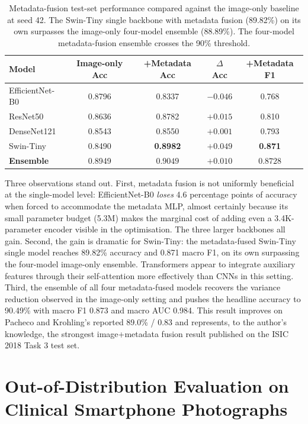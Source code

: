\begin{table}[H]
\centering
\caption{Metadata-fusion test-set performance compared against the image-only baseline at seed 42. The Swin-Tiny single backbone with metadata fusion (89.82\%) on its own surpasses the image-only four-model ensemble (88.89\%). The four-model metadata-fusion ensemble crosses the 90\% threshold.}
\label{tab:meta_fusion}
\begin{tabular}{lcccc}
\toprule
\textbf{Model} & \textbf{Image-only Acc} & \textbf{+Metadata Acc} & \textbf{$\Delta$ Acc} & \textbf{+Metadata F1} \\
\midrule
EfficientNet-B0 & 0.8796 & 0.8337 & $-0.046$ & 0.768 \\
ResNet50        & 0.8636 & 0.8782 & $+0.015$ & 0.810 \\
DenseNet121     & 0.8543 & 0.8550 & $+0.001$ & 0.793 \\
Swin-Tiny       & 0.8490 & \textbf{0.8982} & $\mathbf{+0.049}$ & \textbf{0.871} \\
\midrule
\textbf{Ensemble} & 0.8949 & $\mathbf{0.9049}$ & $\mathbf{+0.010}$ & $\mathbf{0.8728}$ \\
\bottomrule
\end{tabular}
\end{table}

Three observations stand out. First, metadata fusion is not uniformly beneficial at the single-model level: EfficientNet-B0 \textit{loses} 4.6 percentage points of accuracy when forced to accommodate the metadata MLP, almost certainly because its small parameter budget (5.3M) makes the marginal cost of adding even a 3.4K-parameter encoder visible in the optimisation. The three larger backbones all gain. Second, the gain is dramatic for Swin-Tiny: the metadata-fused Swin-Tiny single model reaches 89.82\% accuracy and 0.871 macro F1, on its own surpassing the four-model image-only ensemble. Transformers appear to integrate auxiliary features through their self-attention more effectively than CNNs in this setting. Third, the ensemble of all four metadata-fused models recovers the variance reduction observed in the image-only setting and pushes the headline accuracy to 90.49\% with macro F1 0.873 and macro AUC 0.984. This result improves on Pacheco and Krohling's reported 89.0\% / 0.83 and represents, to the author's knowledge, the strongest image+metadata fusion result published on the ISIC 2018 Task 3 test set.

\section{Out-of-Distribution Evaluation on Clinical Smartphone Photographs}

